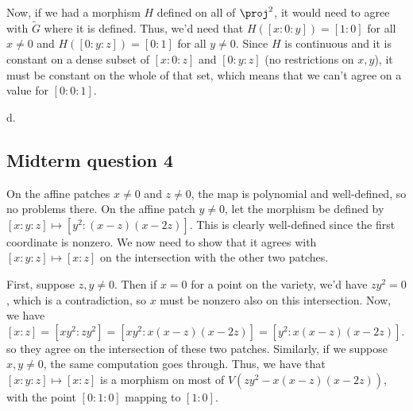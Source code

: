 \documentclass{article}
\begin{document}
Now, if we had a morphism $H$ defined on all of $\proj^2$, it would need to agree with $\tilde{G}$ where it is defined. Thus, we'd need that $H([x:0:y])=[1:0]$ for all $x\neq0$ and $H([0:y:z])=[0:1]$ for all $y\neq0$. Since $H$ is continuous and it is constant on a dense subset of $[x:0:z]$ and $[0:y:z]$ (no restrictions on $x,y$), it must be constant on the whole of that set, which means that we can't agree on a value for $[0:0:1]$.

\noindent d.
\subsection*{Midterm question 4}
On the affine patches $x\neq0$ and $z\neq0$, the map is polynomial and well-defined, so no problems there. On the affine patch $y\neq0$, let the morphism be defined by $[x:y:z]\mapsto[y^2:(x-z)(x-2z)]$. This is clearly well-defined since the first coordinate is nonzero. We now need to show that it agrees with $[x:y:z]\mapsto[x:z]$ on the intersection with the other two patches. 

First, suppose $z,y\neq0$. Then if $x=0$ for a point on the variety, we'd have $zy^2=0$, which is a contradiction, so $x$ must be nonzero also on this intersection. Now, we have $[x:z]=[xy^2:zy^2]=[xy^2:x(x-z)(x-2z)]=[y^2:x(x-z)(x-2z)]$. so they agree on the intersection of these two patches. Similarly, if we suppose $x,y\neq0$, the same computation goes through. Thus, we have that $[x:y:z]\mapsto[x:z]$ is a morphism on most of $V(zy^2-x(x-z)(x-2z))$, with the point $[0:1:0]$ mapping to $[1:0]$.
\end{document}
